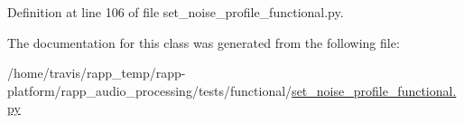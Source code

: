 Definition at line 106 of file set\-\_\-noise\-\_\-profile\-\_\-functional.\-py.



The documentation for this class was generated from the following file\-:\begin{DoxyCompactItemize}
\item 
/home/travis/rapp\-\_\-temp/rapp-\/platform/rapp\-\_\-audio\-\_\-processing/tests/functional/\hyperlink{set__noise__profile__functional_8py}{set\-\_\-noise\-\_\-profile\-\_\-functional.\-py}\end{DoxyCompactItemize}
